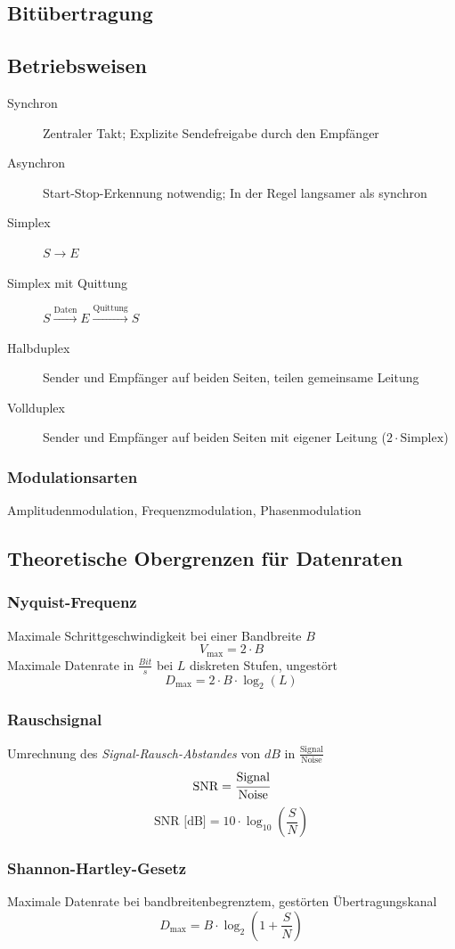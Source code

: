 \documentclass
[
	8pt,		%
	ngerman,	%
	a4paper,	%
	landscape,	%
	final		%
]{extarticle}
\begin{document}
\begin{multicols*}{4}
	\section{Bitübertragung}
	\subsection{Betriebsweisen}
	\begin{description}
		\item[Synchron] Zentraler Takt; Explizite Sendefreigabe durch den
		      Empfänger
		\item[Asynchron] Start-Stop-Erkennung notwendig; In der Regel langsamer
		      als synchron
		\item[Simplex] \(S \rightarrow E\)
		\item[Simplex mit Quittung] \(S \overset{\text{Daten}}{\longrightarrow} E \overset{\text{Quittung}}{\longrightarrow} S\)
		\item[Halbduplex] Sender und Empfänger auf beiden Seiten, teilen
		      gemeinsame Leitung
		\item[Vollduplex] Sender und Empfänger auf beiden Seiten mit eigener
		      Leitung (\(2 \cdot \text{Simplex}\))
	\end{description}
	\subsubsection{Modulationsarten}
	Amplitudenmodulation, Frequenzmodulation, Phasenmodulation
	\subsection{Theoretische Obergrenzen für Datenraten}
	\subsubsection{Nyquist-Frequenz}
	Maximale Schrittgeschwindigkeit bei einer Bandbreite \(B\)
	\[V_\text{max} = 2 \cdot B\]
	Maximale Datenrate in \(\frac{Bit}{s}\) bei \(L\) diskreten Stufen,
	ungestört \[D_\text{max} = 2 \cdot B \cdot \log_{2}(L)\]
	\subsubsection{Rauschsignal}
	Umrechnung des \emph{Signal-Rausch-Abstandes} von \(dB\) in
	\(\frac{\text{Signal}}{\text{Noise}}\)
	\[\text{SNR} = \cfrac{\text{Signal}}{\text{Noise}}\]
	\[\text{SNR [dB]} = 10 \cdot \log_{10}\left(\frac{S}{N}\right)\]
	\subsubsection{Shannon-Hartley-Gesetz}
	Maximale Datenrate bei bandbreitenbegrenztem, gestörten Übertragungskanal
	\[D_{\text{max}} = B \cdot \log_2(1+\frac{S}{N})\]
\end{multicols*}
\end{document}
